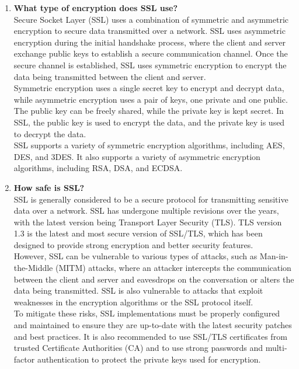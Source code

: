 \documentclass[11pt]{article}
\begin{document}
\begin{enumerate}
    \item \textbf{What type of encryption does SSL use?}\\

          Secure Socket Layer (SSL) uses a combination of symmetric and asymmetric encryption to secure data transmitted over a network. SSL uses asymmetric encryption during the initial handshake process, where the client and server exchange public keys to establish a secure communication channel. Once the secure channel is established, SSL uses symmetric encryption to encrypt the data being transmitted between the client and server.\\

          Symmetric encryption uses a single secret key to encrypt and decrypt data, while asymmetric encryption uses a pair of keys, one private and one public. The public key can be freely shared, while the private key is kept secret. In SSL, the public key is used to encrypt the data, and the private key is used to decrypt the data.\\

          SSL supports a variety of symmetric encryption algorithms, including AES, DES, and 3DES. It also supports a variety of asymmetric encryption algorithms, including RSA, DSA, and ECDSA.

    \item \textbf{How safe is SSL?}\\

          SSL is generally considered to be a secure protocol for transmitting sensitive data over a network. SSL has undergone multiple revisions over the years, with the latest version being Transport Layer Security (TLS). TLS version 1.3 is the latest and most secure version of SSL/TLS, which has been designed to provide strong encryption and better security features.\\

          However, SSL can be vulnerable to various types of attacks, such as Man-in-the-Middle (MITM) attacks, where an attacker intercepts the communication between the client and server and eavesdrops on the conversation or alters the data being transmitted. SSL is also vulnerable to attacks that exploit weaknesses in the encryption algorithms or the SSL protocol itself.\\

          To mitigate these risks, SSL implementations must be properly configured and maintained to ensure they are up-to-date with the latest security patches and best practices. It is also recommended to use SSL/TLS certificates from trusted Certificate Authorities (CA) and to use strong passwords and multi-factor authentication to protect the private keys used for encryption.


\end{enumerate}
\end{document}
